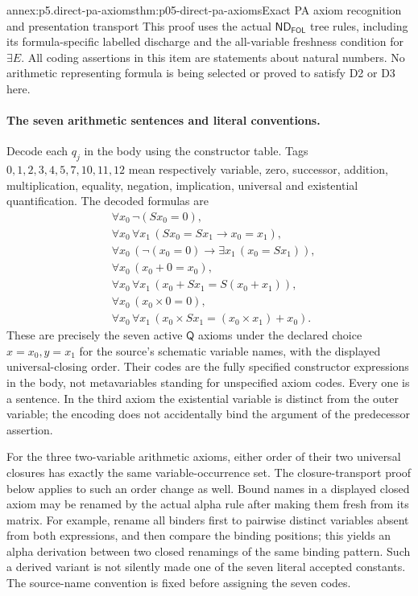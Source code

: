 \begin{annexitem}{annex:p5.direct-pa-axioms}{thm:p05-direct-pa-axioms}{Exact PA axiom recognition and presentation transport}
This proof uses the actual \(\mathsf{ND}_{\mathsf{FOL}}\) tree rules, including its
formula-specific labelled discharge and the all-variable freshness condition
for \(\exists E\).  All coding assertions in this item are statements
about natural numbers.  No arithmetic representing formula is being selected
or proved to satisfy D2 or D3 here.

\paragraph{The seven arithmetic sentences and literal conventions.}
Decode each \(q_j\) in the body using the constructor table.  Tags
\(0,1,2,3,4,5,7,10,11,12\) mean respectively variable, zero,
successor, addition, multiplication, equality, negation, implication,
universal and existential quantification.  The decoded formulas are
\[
\begin{aligned}
 &\forall x_0\,\neg(Sx_0=0),\\
 &\forall x_0\,\forall x_1\,(Sx_0=Sx_1\to x_0=x_1),\\
 &\forall x_0\,(\neg(x_0=0)\to\exists x_1\,(x_0=Sx_1)),\\
 &\forall x_0\,(x_0+0=x_0),\\
 &\forall x_0\,\forall x_1\,(x_0+Sx_1=S(x_0+x_1)),\\
 &\forall x_0\,(x_0\times0=0),\\
 &\forall x_0\,\forall x_1\,
                  (x_0\times Sx_1=(x_0\times x_1)+x_0).
\end{aligned}
\]
These are precisely the seven active \(\mathsf Q\) axioms under the
declared choice \(x=x_0,y=x_1\) for the source's schematic variable
names, with the displayed universal-closing order.  Their codes are the
fully specified constructor expressions in the body, not metavariables
standing for unspecified axiom codes.  Every one is a sentence.  In the
third axiom the existential variable is distinct from the outer variable;
the encoding does not accidentally bind the argument of the predecessor
assertion.

For the three two-variable arithmetic axioms, either order of their two
universal closures has exactly the same variable-occurrence set.  The
closure-transport proof below applies to such an order change as well.
Bound names in a displayed closed axiom may be renamed by the actual alpha
rule after making them fresh from its matrix.  For example, rename all
binders first to pairwise distinct variables absent from both expressions,
and then compare the binding positions; this yields an alpha derivation
between two closed renamings of the same binding pattern.  Such a derived
variant is not silently made one of the seven literal accepted constants.
The source-name convention is fixed before assigning the seven codes.


\end{annexitem}
